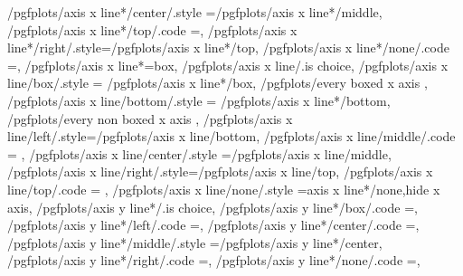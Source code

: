{	/pgfplots/axis x line*/center/.style	={/pgfplots/axis x line*/middle},
	/pgfplots/axis x line*/top/.code	={\def\pgfplots@xaxislinesnum{3}\def\pgfplots@xtickposnum{3}\let\pgfplots@xticklabel@pos\pgfutil@empty},
	/pgfplots/axis x line*/right/.style={/pgfplots/axis x line*/top},
	/pgfplots/axis x line*/none/.code	={\def\pgfplots@xaxislinesnum{4}\def\pgfplots@xtickposnum{4}\let\pgfplots@xticklabel@pos\pgfutil@empty},
	/pgfplots/axis x line*=box,
	/pgfplots/axis x line/.is choice,
	/pgfplots/axis x line/box/.style	={
		/pgfplots/axis x line*/box,
		/pgfplots/every boxed x axis
	},
	/pgfplots/axis x line/bottom/.style	={
		/pgfplots/axis x line*/bottom,
		/pgfplots/every non boxed x axis
	},
	/pgfplots/axis x line/left/.style={/pgfplots/axis x line/bottom},%
	/pgfplots/axis x line/middle/.code	={%
		\ifnum{} %
		\else
		\fi
	},
	/pgfplots/axis x line/center/.style	={/pgfplots/axis x line/middle},
	/pgfplots/axis x line/right/.style={/pgfplots/axis x line/top},%
	/pgfplots/axis x line/top/.code	={
		\ifnum{} %
		\fi
	},
	/pgfplots/axis x line/none/.style	={axis x line*/none,hide x axis},
	/pgfplots/axis y line*/.is choice,
	/pgfplots/axis y line*/box/.code	={\def\pgfplots@yaxislinesnum{0}\def\pgfplots@ytickposnum{0}},
	/pgfplots/axis y line*/left/.code	={\def\pgfplots@yaxislinesnum{1}\def\pgfplots@ytickposnum{1}\let\pgfplots@yticklabel@pos\pgfutil@empty},
	/pgfplots/axis y line*/center/.code	={\def\pgfplots@yaxislinesnum{2}\def\pgfplots@ytickposnum{2}\let\pgfplots@yticklabel@pos\pgfutil@empty},
	/pgfplots/axis y line*/middle/.style	={/pgfplots/axis y line*/center},
	/pgfplots/axis y line*/right/.code	={\def\pgfplots@yaxislinesnum{3}\def\pgfplots@ytickposnum{3}\let\pgfplots@yticklabel@pos\pgfutil@empty},
	/pgfplots/axis y line*/none/.code	={\def\pgfplots@yaxislinesnum{4}\def\pgfplots@ytickposnum{4}\let\pgfplots@yticklabel@pos\pgfutil@empty},
}
